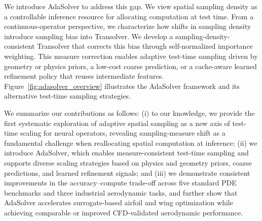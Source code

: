 We introduce AdaSolver to address this gap. We view spatial sampling density as a controllable inference resource for allocating computation at test time. From a continuous-operator perspective, we characterize how shifts in sampling density introduce sampling bias into Transolver. We develop a sampling-density-consistent Transolver that corrects this bias through self-normalized importance weighting. This measure correction enables adaptive test-time sampling driven by geometry or physics priors, a low-cost coarse prediction, or a cache-aware learned refinement policy that reuses intermediate features. Figure~\ref{fig:adasolver_overview} illustrates the AdaSolver framework and its alternative test-time sampling strategies.


We summarize our contributions as follows: (i) to our knowledge, we provide the first systematic exploration of adaptive spatial sampling as a new axis of test-time scaling for neural operators, revealing sampling-measure shift as a fundamental challenge when reallocating spatial computation at inference; (ii) we introduce AdaSolver, which enables measure-consistent test-time sampling and supports diverse scaling strategies based on physics and geometry priors, coarse predictions, and learned refinement signals; and (iii) we demonstrate consistent improvements in the accuracy--compute trade-off across five standard PDE benchmarks and three industrial aerodynamic tasks, and further show that AdaSolver accelerates surrogate-based airfoil and wing optimization while achieving comparable or improved CFD-validated aerodynamic performance.